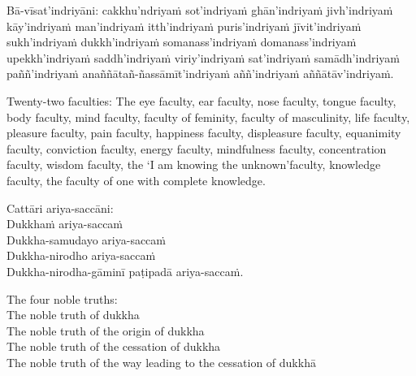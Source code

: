 \suttaRef{[MN 115]}

\begin{pali-hang-continued}
Bā-vīsat'indriyāni:\hyperlink{endnote131-appendix}{\hypertarget{endnote131-body}{}} cakkhu'ndriyaṁ sot'indriyaṁ ghān'indriyaṁ jivh'indriyaṁ kāy'indriyaṁ man'indriyaṁ itth'indriyaṁ puris'indriyaṁ jīvit'indriyaṁ sukh'indriyaṁ dukkh'indriyaṁ somanass'indriyaṁ domanass'indriyaṁ upekkh'indriyaṁ saddh'indriyaṁ viriy'indriyaṁ sat'indriyaṁ samādh'indriyaṁ paññ'indriyaṁ anaññātañ-ñassāmīt'indriyaṁ aññ'indriyaṁ aññātāv'indriyaṁ.
\end{pali-hang-continued}

\begin{english-verses}
  Twenty-two faculties: The eye faculty, ear faculty, nose faculty, tongue faculty, body faculty, mind faculty, faculty of feminity, faculty of masculinity, life faculty, pleasure faculty, pain faculty, happiness faculty, displeasure faculty, equanimity faculty, conviction faculty, energy faculty, mindfulness faculty, concentration faculty, wisdom faculty, the `I am knowing the unknown'faculty, knowledge faculty, the faculty of one with complete knowledge.
\end{english-verses}

\suttaRef{[Vibh]}

\begin{pali-hang-continued}
Cattāri ariya-saccāni:\\
Dukkhaṁ ariya-saccaṁ\\
Dukkha-samudayo ariya-saccaṁ\\
Dukkha-nirodho ariya-saccaṁ\\
Dukkha-nirodha-gāminī paṭipadā ariya-saccaṁ.
\end{pali-hang-continued}

\begin{english-verses}
  The four noble truths:\\
  The noble truth of dukkha\\
  The noble truth of the origin of dukkha\\
  The noble truth of the cessation of dukkha\\
  The noble truth of the way leading to the cessation of dukkhā
\end{english-verses}

\suttaRef{[SN 56.24]}

